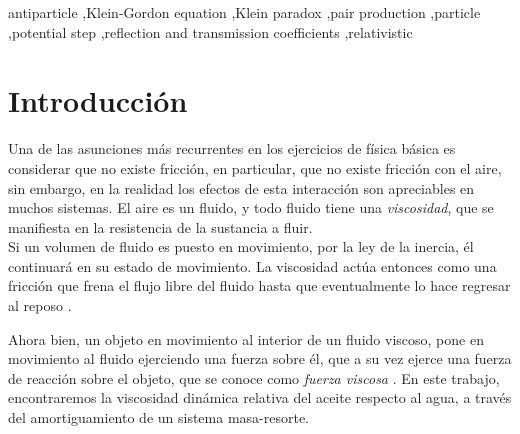 \documentclass[final,5p,times,twocolumn, nopreprintline]{elsarticle}
\numberwithin{equation}{section}
\begin{document}
\begin{frontmatter}


\begin{keyword}
antiparticle \sep Klein-Gordon equation \sep Klein paradox \sep pair production \sep particle \sep potential step \sep reflection and transmission coefficients \sep relativistic


\end{keyword}


\end{frontmatter}




\section{Introducción}

Una de las asunciones más recurrentes en los ejercicios de física básica es considerar que no existe fricción, en particular, que no existe fricción con el aire, sin embargo, en la realidad los efectos de esta interacción son apreciables en muchos sistemas. El aire es un fluido, y todo fluido tiene una \emph{viscosidad}, que se manifiesta en la resistencia de la sustancia a fluir.\\

Si un volumen de fluido es puesto en movimiento, por la ley de la inercia, él continuará en su estado de movimiento. La viscosidad actúa entonces como una fricción que frena el flujo libre del fluido hasta que eventualmente lo hace regresar al reposo \cite{lautrup2011physics}.

Ahora bien, un objeto en movimiento al interior de un fluido viscoso, pone en movimiento al fluido ejerciendo una fuerza sobre él, que a su vez ejerce una fuerza de reacción sobre el objeto, que se conoce como \emph{fuerza viscosa} \cite{kolenkow2021introduction}. En este trabajo, encontraremos la viscosidad dinámica relativa del aceite respecto al agua, a través del amortiguamiento de un sistema masa-resorte.
\end{document}
